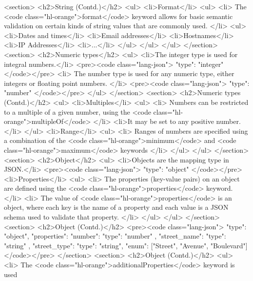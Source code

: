 \documentclass{efd-lecture}
\begin{document}
  <section>
    <h2>String (Contd.)</h2>
    <ul>
      <li>Format</li>
      <ul>
        <li>
          The <code class="hl-orange">format</code> keyword allows for basic
          semantic validation on certain kinds of string values that are
          commonly used.
        </li>
        <ul>
          <li>Dates and times</li>
          <li>Email addresses</li>
          <li>Hostnames</li>
          <li>IP Addresses</li>
          <li>...</li>
        </ul>
      </ul>
    </ul>
  </section>
  <section>
    <h2>Numeric types</h2>
    <ul>
      <li>The integer type is used for integral numbers.</li>
      <pre><code class="lang-json">
{ "type": "integer" }
    </code></pre>
      <li>
        The number type is used for any numeric type, either integers or
        floating point numbers.
      </li>
      <pre><code class="lang-json">
{ "type": "number" }
    </code></pre>
    </ul>
  </section>
  <section>
    <h2>Numeric types (Contd.)</h2>
    <ul>
      <li>Multiples</li>
      <ul>
        <li>
          Numbers can be restricted to a multiple of a given number, using the
          <code class="hl-orange">multipleOf</code>
        </li>
        <li>It may be set to any positive number.</li>
      </ul>
      <li>Range</li>
      <ul>
        <li>
          Ranges of numbers are specified using a combination of the
          <code class="hl-orange">minimum</code> and
          <code class="hl-orange">maximum</code> keywords
        </li>
      </ul>
    </ul>
  </section>
  <section>
    <h2>Object</h2>
    <ul>
      <li>Objects are the mapping type in JSON.</li>
      <pre><code class="lang-json">
{ "type": "object" }
      </code></pre>
      <li>Properties</li>
      <ul>
        <li>
          The properties (key-value pairs) on an object are defined using the
          <code class="hl-orange">properties</code> keyword.
        </li>
        <li>
          The value of <code class="hl-orange">properties</code> is an object,
          where each key is the name of a property and each value is a JSON
          schema used to validate that property.
        </li>
      </ul>
    </ul>
  </section>
  <section>
    <h2>Object (Contd.)</h2>
    <pre><code class="lang-json">
{
  "type": "object",
  "properties": {
    "number":      { "type": "number" },
    "street_name": { "type": "string" },
    "street_type": { "type": "string",
                     "enum": ["Street", "Avenue", "Boulevard"]
                   }
  }
}
    </code></pre>
  </section>
  <section>
    <h2>Object (Contd.)</h2>
    <ul>
      <li>
        The <code class="hl-orange">additionalProperties</code> keyword is used
\end{document}
